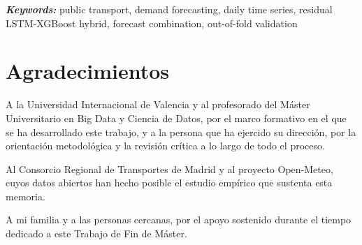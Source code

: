 \vspace{0.2cm}

{\small\textbf{\textsl{Keywords:\hspace{0.3cm}}} public transport, demand
forecasting, daily time series, residual LSTM-XGBoost hybrid, forecast
combination, out-of-fold validation}

\newpage
\section*{Agradecimientos}\label{sec:agradecimientos}

A la Universidad Internacional de Valencia y al profesorado del Máster
Universitario en Big Data y Ciencia de Datos, por el marco formativo en el que
se ha desarrollado este trabajo, y a la persona que ha ejercido su dirección,
por la orientación metodológica y la revisión crítica a lo largo de todo el
proceso.

Al Consorcio Regional de Transportes de Madrid y al proyecto Open-Meteo, cuyos
datos abiertos han hecho posible el estudio empírico que sustenta esta memoria.

A mi familia y a las personas cercanas, por el apoyo sostenido durante el tiempo
dedicado a este Trabajo de Fin de Máster.
